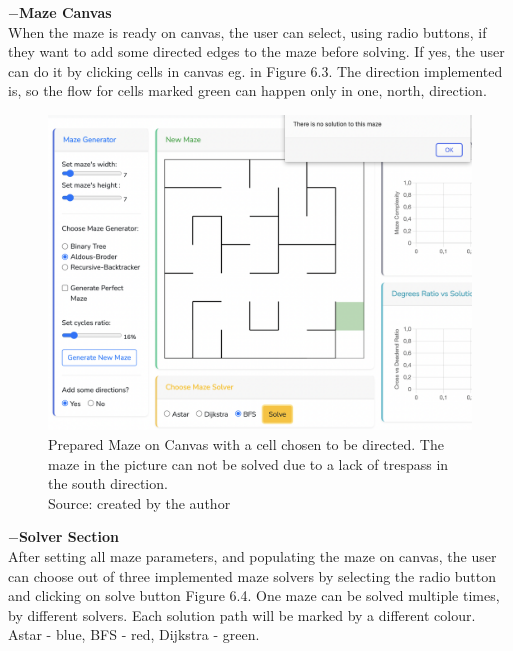 \newline   
\textbf{$-$Maze Canvas}\\
When the maze is ready on canvas, the user can select, using radio buttons, if they want to add some directed edges to the maze before solving. If yes, the user can do it 
by clicking cells in canvas eg. in Figure 6.3. The direction implemented is, so the flow for cells marked green can happen only in one, north, direction.\\
\begin{figure}[!h]
    \centering
    \includegraphics[width=0.5\linewidth]{mazeDirection}
    \caption{Prepared Maze on Canvas with a cell chosen to be directed. The maze in the picture can not be solved due to a lack of trespass in the south direction.\\Source: created by the author}
    \end{figure}
\newpage
\textbf{$-$Solver Section}\\
After setting all maze parameters, and populating the maze on canvas, the user can choose out of three implemented maze solvers by selecting the radio button
and clicking on solve button Figure 6.4. One maze can be solved multiple times, by different solvers. Each solution path will be marked by a different colour. 
Astar - blue, BFS - red, Dijkstra - green.\\
